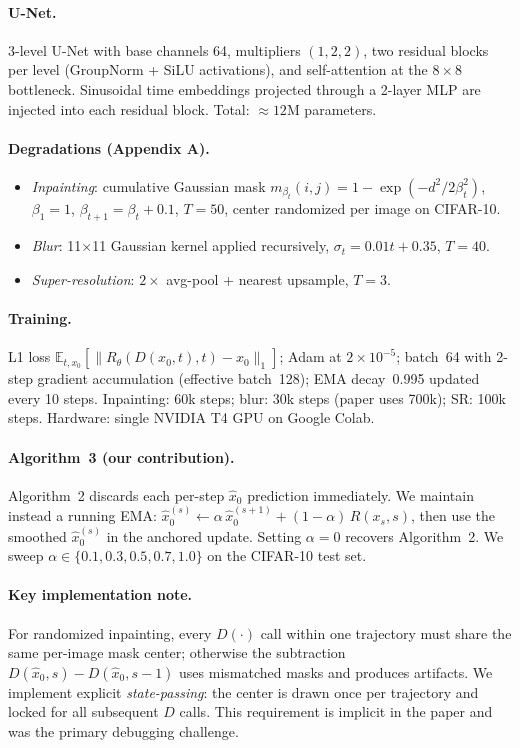 \documentclass[11pt]{article}
\begin{document}
\paragraph{U-Net.}
3-level U-Net with base channels 64, multipliers $(1,2,2)$, two residual blocks per level
(GroupNorm + SiLU activations), and self-attention at the $8{\times}8$ bottleneck.
Sinusoidal time embeddings projected through a 2-layer MLP are injected into each residual
block. Total: ${\approx}12$M parameters.

\paragraph{Degradations (Appendix A).}
\begin{itemize}
  \item \emph{Inpainting}: cumulative Gaussian mask
    $m_{\beta_t}(i,j)=1-\exp(-d^2/2\beta_t^2)$, $\beta_1{=}1$, $\beta_{t+1}{=}\beta_t+0.1$,
    $T{=}50$, center randomized per image on CIFAR-10.
  \item \emph{Blur}: 11${\times}$11 Gaussian kernel applied recursively,
    $\sigma_t = 0.01t+0.35$, $T{=}40$.
  \item \emph{Super-resolution}: $2{\times}$ avg-pool + nearest upsample, $T{=}3$.
\end{itemize}

\paragraph{Training.}
L1 loss $\mathbb{E}_{t,x_0}[\|R_\theta(D(x_0,t),t)-x_0\|_1]$; Adam at $2{\times}10^{-5}$;
batch~64 with 2-step gradient accumulation (effective batch~128); EMA decay~0.995 updated
every 10 steps. Inpainting: 60k steps; blur: 30k steps (paper uses 700k); SR: 100k steps.
Hardware: single NVIDIA T4 GPU on Google Colab.

\paragraph{Algorithm~3 (our contribution).}
Algorithm~2 discards each per-step $\hat{x}_0$ prediction immediately. We maintain instead
a running EMA: $\hat{x}_0^{(s)} \leftarrow \alpha\,\hat{x}_0^{(s+1)} + (1{-}\alpha)\,R(x_s,s)$,
then use the smoothed $\hat{x}_0^{(s)}$ in the anchored update. Setting $\alpha{=}0$ recovers
Algorithm~2. We sweep $\alpha \in \{0.1, 0.3, 0.5, 0.7, 1.0\}$ on the CIFAR-10 test set.

\paragraph{Key implementation note.}
For randomized inpainting, every $D(\cdot)$ call within one trajectory must share the same
per-image mask center; otherwise the subtraction $D(\hat{x}_0,s) - D(\hat{x}_0,s{-}1)$ uses
mismatched masks and produces artifacts. We implement explicit \emph{state-passing}: the center
is drawn once per trajectory and locked for all subsequent $D$ calls. This requirement is
implicit in the paper and was the primary debugging challenge.
\end{document}
